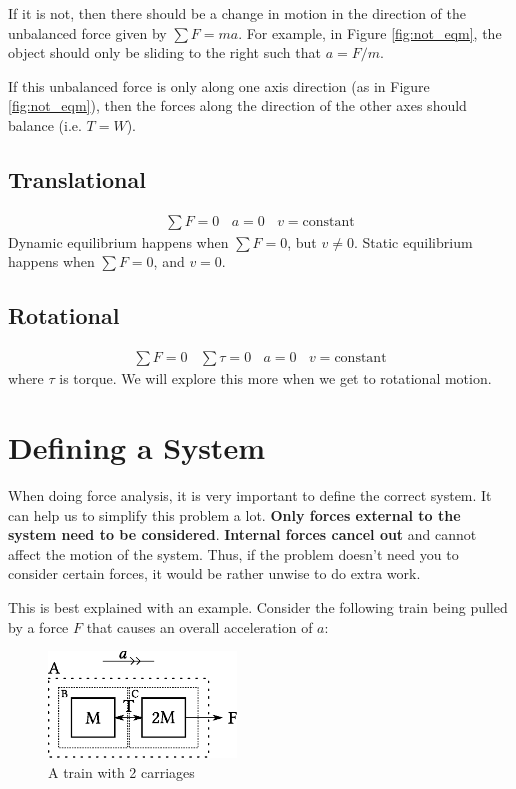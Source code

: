 \documentclass[11pt]{article}
\numberwithin{equation}{section}
\begin{document}
		If it is not, then there should be a change in motion in the direction of the unbalanced force given by $\sum F=ma$. For example, in Figure \ref{fig:not_eqm}, the object should only be sliding to the right such that $a = F/m$.
		
		If this unbalanced force is only along one axis direction (as in Figure \ref{fig:not_eqm}), then the forces along the direction of the other axes should balance (i.e. $T = W$).
		\subsection{Translational}
		\begin{align*}
			\sum F = 0 ~~~~ a = 0 ~~~~ v = \text{constant}
		\end{align*}
		Dynamic equilibrium happens when $\sum F=0$, but $v \neq 0$. Static equilibrium happens when $\sum F=0$, and $v = 0$.
		\subsection{Rotational}
		\begin{align*}
		\sum F = 0 ~~~~ \sum \tau = 0 ~~~~ a = 0 ~~~~ v = \text{constant}
		\end{align*}
		where $\tau$ is torque. We will explore this more when we get to rotational motion.
	\section{Defining a System}
	When doing force analysis, it is very important to define the correct system. It can help us to simplify this problem a lot. \textbf{Only forces external to the system need to be considered}. \textbf{Internal forces cancel out} and cannot affect the motion of the system. Thus, if the problem doesn't need you to consider certain forces, it would be rather unwise to do extra work.
	
	This is best explained with an example. Consider the following train being pulled by a force $F$ that causes an overall acceleration of $a$:
	
	\begin{figure}[h]
		\centering
		\includegraphics[width=5cm]{system.eps}
		\caption{A train with 2 carriages}
	\end{figure}
	
\end{document}
